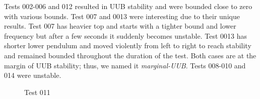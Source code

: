 \documentclass[journal]{IEEEtran}
\begin{document}
Tests 002-006 and 012 resulted in UUB stability and were bounded close to zero with
various bounds. Test 007 and 0013 were interesting due to their unique results.
Test 007 has heavier top and starts with a tighter bound and lower frequency
but after a few seconds it suddenly becomes unstable. Test 0013 has shorter
lower pendulum and moved violently from left to right to reach stability and
remained bounded throughout the duration of the test. Both cases are at the
margin of UUB stability; thus, we named it \emph{marginal-UUB}.
Tests 008-010 and 014 were unstable.





\begin{figure}
\centering
{}
\caption{Test 011}
\label{fig:t011}
\end{figure}
\end{document}
